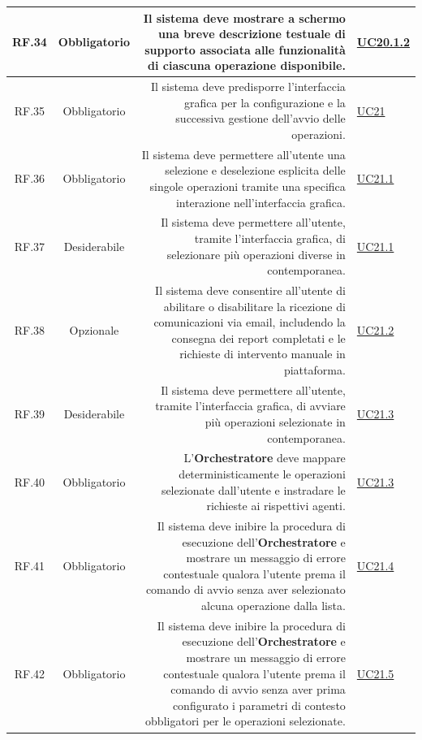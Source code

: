 \documentclass[12pt, a4paper]{article}
\begin{document}
\begin{xltabular}{\textwidth}{|c|c|D|F|}
    RF.34 & Obbligatorio & Il sistema deve mostrare a schermo una breve descrizione testuale di supporto associata alle funzionalità di ciascuna operazione disponibile. & \hyperref[uc:20.1.2]{UC20.1.2} \\ \hline
    
    RF.35 & Obbligatorio & Il sistema deve predisporre l'interfaccia grafica per la configurazione e la successiva gestione dell'avvio delle operazioni. & \hyperref[uc:21]{UC21} \\ \hline
    
    RF.36 & Obbligatorio & Il sistema deve permettere all'utente una selezione e deselezione esplicita delle singole operazioni tramite una specifica interazione nell'interfaccia grafica. & \hyperref[uc:21.1]{UC21.1} \\ \hline

    RF.37 & Desiderabile & Il sistema deve permettere all'utente, tramite l'interfaccia grafica, di selezionare più operazioni diverse in contemporanea. & \hyperref[uc:21.1]{UC21.1} \\ \hline

    RF.38 & Opzionale & Il sistema deve consentire all'utente di abilitare o disabilitare la ricezione di comunicazioni via email, includendo la consegna dei report completati e le richieste di intervento manuale in piattaforma. & \hyperref[uc:21.2]{UC21.2} \\ \hline
    
    RF.39 & Desiderabile & Il sistema deve permettere all'utente, tramite l'interfaccia grafica, di avviare più operazioni selezionate in contemporanea. & \hyperref[uc:21.3]{UC21.3} \\ \hline
    
    RF.40 & Obbligatorio & L'\textbf{Orchestratore} deve mappare deterministicamente le operazioni selezionate dall'utente e instradare le richieste ai rispettivi agenti. & \hyperref[uc:21.3]{UC21.3} \\ \hline
    
    RF.41 & Obbligatorio & Il sistema deve inibire la procedura di esecuzione dell'\textbf{Orchestratore} e mostrare un messaggio di errore contestuale qualora l'utente prema il comando di avvio senza aver selezionato alcuna operazione dalla lista. & \hyperref[uc:21.4]{UC21.4} \\ \hline
    
    RF.42 & Obbligatorio & Il sistema deve inibire la procedura di esecuzione dell'\textbf{Orchestratore} e mostrare un messaggio di errore contestuale qualora l'utente prema il comando di avvio senza aver prima configurato i parametri di contesto obbligatori per le operazioni selezionate. & \hyperref[uc:21.5]{UC21.5} \\ \hline
    

\end{xltabular}
\end{document}
